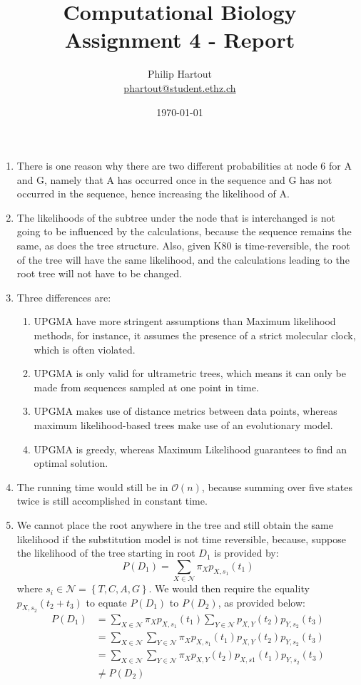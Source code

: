 \documentclass[a4paper,10pt,twoside]{article}
\title{Computational Biology \\ Assignment 4 - Report}
\author{Philip Hartout \\ \url{phartout@student.ethz.ch}}
\date{\today}
\begin{document}
\maketitle

\begin{enumerate}
   \item There is one reason why there are two different probabilities at node 6 for A and G, namely that A has occurred once in the sequence and G has not occurred in the sequence, hence increasing the likelihood of A.
   \item The likelihoods of the subtree under the node that is interchanged is not going to be influenced by the calculations, because the sequence remains the same, as does the tree structure. Also, given K80 is time-reversible, the root of the tree will have the same likelihood, and the calculations leading to the root tree will not have to be changed.
   \item Three differences are:
   \begin{enumerate}
       \item UPGMA have more stringent assumptions than Maximum likelihood methods, for instance, it assumes the presence of a strict molecular clock, which is often violated.
       \item UPGMA is only valid for ultrametric trees, which means it can only be made from sequences sampled at one point in time.
       \item UPGMA makes use of distance metrics between data points, whereas maximum likelihood-based trees make use of an evolutionary model.
       \item UPGMA is greedy, whereas Maximum Likelihood guarantees to find an optimal solution.
   \end{enumerate}
   \item The running time would still be in $\mathcal{O}(n)$, because summing over five states twice is still accomplished in constant time.
   \item We cannot place the root anywhere in the tree and still obtain the same likelihood if the substitution model is not time reversible, because, suppose the likelihood of the tree starting in root $D_1$ is provided by:
   \begin{equation*}
        P(D_1) = \sum_{X\in \mathcal{N}} \pi_{X}p_{X,s_1}(t_1)
   \end{equation*}
   where $s_i\in \mathcal{N}=\left\{T,C,A,G\right\}$.
   We would then require the equality $p_{X,s_2}(t_2+t_3)$ to equate $P(D_1)$ to $P(D_2)$, as provided below:
   \begin{align*}
       P(D_1) &= \sum_{X\in \mathcal{N}} \pi_{X}p_{X,s_1}(t_1) \sum_{Y\in \mathcal{N}} p_{X,Y}(t_2)p_{Y,s_2}(t_3) \\
       &= \sum_{X\in \mathcal{N}}\sum_{Y\in \mathcal{N}}\pi_{X}p_{X,s_1}(t_1)p_{X,Y}(t_2)p_{Y, s_2}(t_3)\\
       &= \sum_{X\in \mathcal{N}}\sum_{Y\in \mathcal{N}}\pi_{X}p_{X,Y}(t_2)p_{X,s1}(t_1)p_{Y, s_2}(t_3)\\
       & \neq P(D_2)
   \end{align*}

\end{enumerate}
\end{document}
